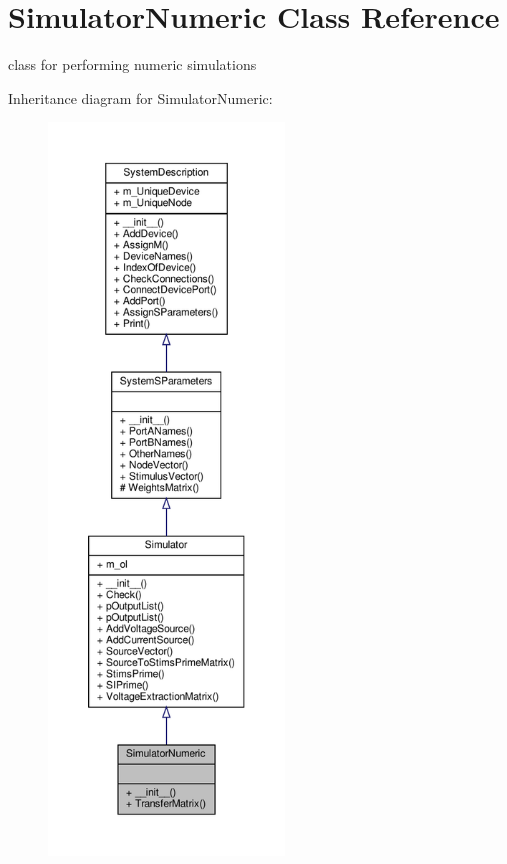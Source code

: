 \hypertarget{classSignalIntegrity_1_1SystemDescriptions_1_1SimulatorNumeric_1_1SimulatorNumeric}{}\section{Simulator\+Numeric Class Reference}
\label{classSignalIntegrity_1_1SystemDescriptions_1_1SimulatorNumeric_1_1SimulatorNumeric}


class for performing numeric simulations  




Inheritance diagram for Simulator\+Numeric\+:
\nopagebreak
\begin{figure}[H]
\begin{center}
\leavevmode
\includegraphics[height=550pt]{classSignalIntegrity_1_1SystemDescriptions_1_1SimulatorNumeric_1_1SimulatorNumeric__inherit__graph}
\end{center}
\end{figure}



